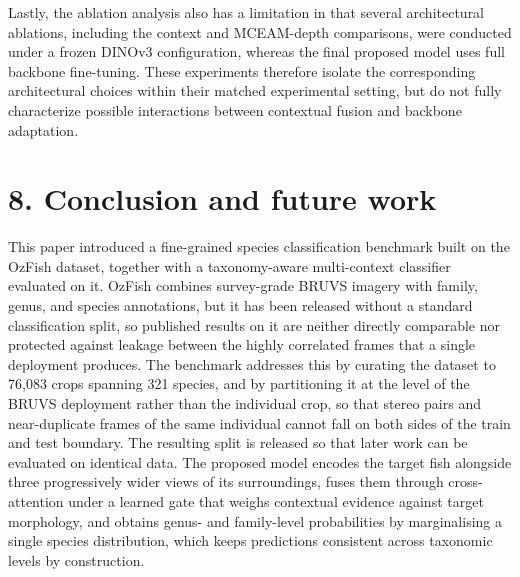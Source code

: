 \documentclass[preprint,12pt]{elsarticle}
\begin{document}
Lastly, the ablation analysis also has a limitation in that several
architectural ablations, including the context and MCEAM-depth
comparisons, were conducted under a frozen DINOv3 configuration, whereas
the final proposed model uses full backbone fine-tuning. These
experiments therefore isolate the corresponding architectural choices
within their matched experimental setting, but do not fully characterize
possible interactions between contextual fusion and backbone adaptation.

\section*{8. Conclusion and future
work}\label{conclusion-and-future-work}

This paper introduced a fine-grained species classification benchmark
built on the OzFish dataset, together with a taxonomy-aware
multi-context classifier evaluated on it. OzFish combines survey-grade
BRUVS imagery with family, genus, and species annotations, but it has
been released without a standard classification split, so published
results on it are neither directly comparable nor protected against
leakage between the highly correlated frames that a single deployment
produces. The benchmark addresses this by curating the dataset to 76,083
crops spanning 321 species, and by partitioning it at the level of the
BRUVS deployment rather than the individual crop, so that stereo pairs
and near-duplicate frames of the same individual cannot fall on both
sides of the train and test boundary. The resulting split is released so
that later work can be evaluated on identical data. The proposed model
encodes the target fish alongside three progressively wider views of its
surroundings, fuses them through cross-attention under a learned gate
that weighs contextual evidence against target morphology, and obtains
genus- and family-level probabilities by marginalising a single species
distribution, which keeps predictions consistent across taxonomic levels
by construction.
\end{document}
